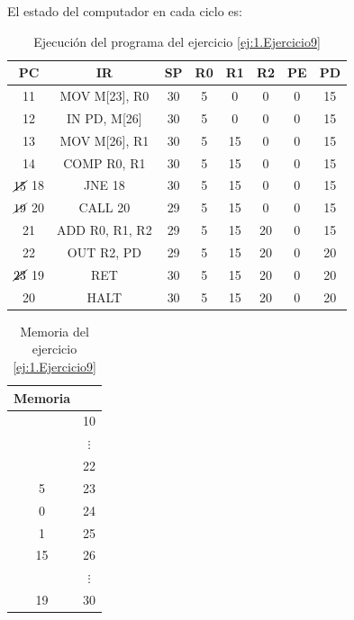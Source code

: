 \begin{ejercicio}
    El estado del computador en cada ciclo es:
    \begin{table}[H]
        \centering
        \begin{tabular}{c|c|c|c|c|c|c|c}
            PC & IR & SP & R0 & R1 & R2 & PE & PD \\ \hline
            11 & MOV M[23], R0 & 30 & 5 & 0 & 0 & 0 & 15 \\
            12 & IN PD, M[26] & 30 & 5 & 0 & 0 & 0 & 15 \\
            13 & MOV M[26], R1 & 30 & 5 & 15 & 0 & 0 & 15 \\
            14 & COMP R0, R1 & 30 & 5 & 15 & 0 & 0 & 15 \\
            $\cancel{15}$ 18 & JNE 18 & 30 & 5 & 15 & 0 & 0 & 15 \\
            $\cancel{19}$ 20 & CALL 20 & 29 & 5 & 15 & 0 & 0 & 15 \\
            21 & ADD R0, R1, R2 & 29 & 5 & 15 & 20 & 0 & 15 \\
            22 & OUT R2, PD & 29 & 5 & 15 & 20 & 0 & 20 \\
            $\cancel{23}$ 19 & RET & 30 & 5 & 15 & 20 & 0 & 20 \\
            20 & HALT & 30 & 5 & 15 & 20 & 0 & 20
        \end{tabular}
        \caption{Ejecución del programa del ejercicio \ref{ej:1.Ejercicio9}}
        \label{tab:Ejercicio9}
    \end{table}

    \begin{table}[H]
        \centering
        \begin{tabular}{|c|c}
            Memoria & \\ \hline
             & 10 \\
             & $\vdots$ \\
             & 22\\
            5 & 23\\
            0 & 24\\
            1 & 25\\
            15 & 26\\
             & $\vdots$ \\
            19 & 30\\
        \end{tabular}
        \caption{Memoria del ejercicio \ref{ej:1.Ejercicio9}}
        \label{tab:MemEjercicio9}
    \end{table}
\end{ejercicio}
